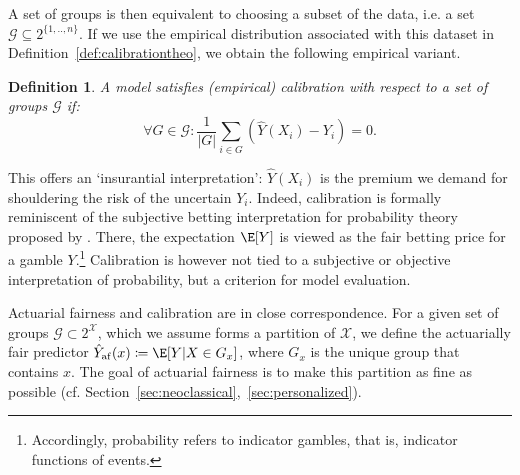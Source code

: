 \documentclass[11pt]{article} %
\makeatletter
\newcommand*{\ie}{i.e.\@\xspace}
\newcommand*{\cf}{cf.\@\xspace}
\newcommand{\actfairpred}{\hat{Y}_{\mathrm{af}}}
\newtheorem{definition}[theorem]{Definition}
\makeatother
\begin{document}
A set of groups is then equivalent to choosing a subset of the data, \ie a set $\mathcal{G} \subseteq 2^{\{1,..,n\}}$.
If we use the empirical distribution associated with this dataset in Definition~\ref{def:calibrationtheo}, we obtain the following empirical variant.
\begin{definition}
\label{def:generalcalibration}
    A model satisfies (empirical) calibration with respect to a set of groups $\mathcal{G}$ if:
    \begin{equation}
         \forall G \in \mathcal{G}: \frac{1}{|G|} \sum_{i \in G} (\hat{Y}(X_i) - Y_i) = 0.
    \end{equation}
\end{definition}
This offers an `insurantial interpretation': $\hat{Y}(X_i)$ is the premium we demand for shouldering the risk of the uncertain $Y_i$. Indeed, calibration is formally reminiscent of the subjective betting interpretation for probability theory proposed by \citet{de2017theory}.
There, the expectation $\E[Y]$ is viewed as the fair betting price for a gamble $Y$.\footnote{Accordingly, probability refers to indicator gambles, that is, indicator functions of events.} Calibration is however not tied to a subjective or objective interpretation of probability, but a criterion for model evaluation.

Actuarial fairness and calibration are in close correspondence. For a given set of groups $\mathcal{G} \subset 2^{\mathcal{X}}$, which we assume forms a partition of $\mathcal{X}$, we define the actuarially fair predictor $\actfairpred(x) \coloneqq \E[Y|X \in G_x]$, where $G_x$ is the unique group that contains $x$. The goal of actuarial fairness is to make this partition as fine as possible (\cf Section~\ref{sec:neoclassical},~\ref{sec:personalized}).
\end{document}
